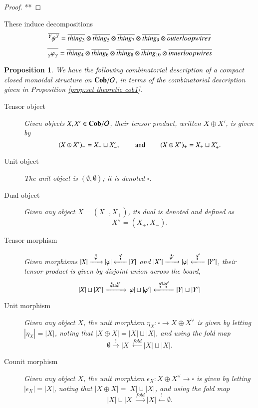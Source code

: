 \documentclass{amsart}
\def\tn{\textnormal}
\def\mc{\mathcal}
\def\hsp{\hspace{.3in}}
\def\to{\rightarrow}
\def\taking{\colon}
\def\ol{\overline}
\newcommand{\To}[1]{\xrightarrow{#1}}
\newcommand{\Too}[1]{\xrightarrow{\ \ #1\ \ }}
\newcommand{\From}[1]{\xleftarrow{#1}}
\newcommand{\Fromm}[1]{\xleftarrow{\ \ #1\ \ }}
\def\Cob{{\bf Cob}}
\def\mcO{\mc{O}}
\newcommand{\inp}[1]{{#1_-}}
\newcommand{\outp}[1]{{#1_+}}
\newcommand{\domn}[1]{{\accentset{\bullet}{#1}}}
\newcommand{\codomn}[1]{{\underaccent{\bullet}{#1}}}
\newcommand{\feeddd}[3]{{\tensor*[^{#2}_{\color{white}{!}}]{{#1}}{^{#3}}}}%
\newcommand{\feedcc}[3]{{\tensor*[^{\color{white}{!}}_{#2}]{{#1}}{_{#3}}}}
\newtheorem{proposition}[subsubsection]{Proposition}
\theoremstyle{remark}
\theoremstyle{definition}
\begin{document}
{\begin{proof}

**

\end{proof}

These induce decompositions
\[\ol{\feeddd{\psi}{Y}{Y}}=\ol{thing_3}\otimes \ol{thing_5}\otimes \ol{thing_7}\otimes \ol{thing_9}\otimes \ol{outer loop wires}\]
\[\ol{\feedcc{\varphi}{Y}{Y}}=\ol{thing_4}\otimes \ol{thing_6}\otimes \ol{thing_8}\otimes \ol{thing_{10}}\otimes \ol{inner loop wires}\]}%

\begin{proposition}

We have the following combinatorial description of a compact closed monoidal structure on $\Cob/\mcO$, in terms of the combinatorial description given in Proposition \ref{prop:set theoretic cob1}.
\begin{description}
\item [Tensor object] Given objects $X,X'\in\Cob/\mcO$, their tensor product, written $X\oplus X'$, is given by 
$$\inp{(X\oplus X')}=\inp{X}\sqcup\inp{X'}, \hsp\tn{and}\hsp \outp{(X\oplus X')}=\outp{X}\sqcup\outp{X'}.$$
\item [Unit object] The unit object is $(\emptyset,\emptyset)$; it is denoted $\square$.
\item [Dual object] Given any object $X=(\inp{X},\outp{X})$, its dual is denoted and defined as 
$$X^\vee=(\outp{X},\inp{X}).$$
\item [Tensor morphism] Given morphisms $|X|\Too{\domn{\varphi}}|\varphi|\Fromm{\codomn{\varphi}}|Y|$ and $|X'|\Too{\domn{\varphi}\hspace{0pt}'}|\varphi|\Fromm{\codomn{\varphi}'}|Y'|$, their tensor product is given by disjoint union across the board,
$$|X|\sqcup|X'|\Too{\domn{\varphi}\sqcup\domn{\varphi}'}|\varphi|\sqcup|\varphi'|\Fromm{\codomn{\varphi}\sqcup\codomn{\varphi}\hspace{0in}'}|Y|\sqcup|Y'|$$
\item [Unit morphism] Given any object $X$, the unit morphism $\eta_X\taking\square\to X\oplus X^\vee$ is given by letting $|\eta_X|=|X|$, noting that $|X\oplus X|=|X|\sqcup|X|$, and using the fold map 
$$\emptyset\To{!}|X|\From{fold}|X|\sqcup|X|.$$
\item [Counit morphism] Given any object $X$, the unit morphism $\epsilon_X\taking X\oplus X^\vee\to\square$ is given by letting $|\epsilon_X|=|X|$, noting that $|X\oplus X|=|X|\sqcup|X|$, and using the fold map 
$$|X|\sqcup|X|\To{fold}|X|\From{!}\emptyset.$$

\end{description}

\end{proposition}
\end{document}

